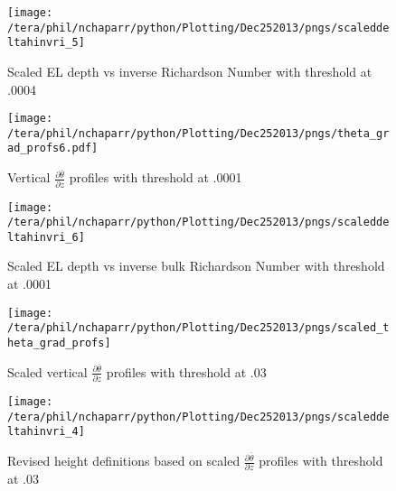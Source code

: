 \begin{figure}[htbp]
    \centering
    \texttt{[image: /tera/phil/nchaparr/python/Plotting/Dec252013/pngs/scaleddeltahinvri\_5]}
    \caption{Scaled EL depth vs inverse Richardson Number with threshold at .0004}
    \label{fig:scaledeltahinvri1}   %
\end{figure}

\begin{figure}[htbp]
    \centering
    \texttt{[image: /tera/phil/nchaparr/python/Plotting/Dec252013/pngs/theta\_grad\_profs6.pdf]}
    \caption{Vertical $\frac{\partial \overline{\theta}}{\partial z}$ profiles with threshold at .0001}
    \label{fig:thresh2}   %
\end{figure}

\begin{figure}[htbp]
    \centering
    \texttt{[image: /tera/phil/nchaparr/python/Plotting/Dec252013/pngs/scaleddeltahinvri\_6]}
    \caption{Scaled EL depth vs inverse bulk Richardson Number with threshold at .0001}
    \label{fig:scaledeltahinvri2}   %
\end{figure}

\begin{figure}[htbp]
    \centering
    \texttt{[image: /tera/phil/nchaparr/python/Plotting/Dec252013/pngs/scaled\_theta\_grad\_profs]}
    \caption{Scaled vertical $\frac{\partial \overline{\theta}}{\partial z}$ profiles with threshold at .03}
    \label{fig:thresh3}   %
\end{figure}

\begin{figure}[htbp]
    \centering
    \texttt{[image: /tera/phil/nchaparr/python/Plotting/Dec252013/pngs/scaleddeltahinvri\_4]}
    \caption{Revised height definitions based on scaled $\frac{\partial \overline{\theta}}{\partial z}$ profiles with threshold at .03}
    \label{fig:heightdefs1}   %
\end{figure}


